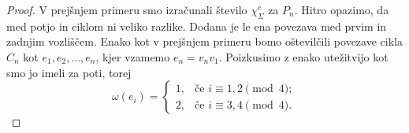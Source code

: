 \documentclass[12pt,a4paper,twoside]{article}
\theoremstyle{definition} %
\theoremstyle{plain} %
\newcommand{\ec}{\chi_{\Sigma}^e}
\numberwithin{equation}{section}  %
\begin{document}
\begin{proof}
	
	V prejšnjem primeru smo izračunali število $\ec$ za $P_n$. Hitro opazimo, da med potjo in ciklom ni veliko razlike. Dodana je le ena povezava med prvim in zadnjim vozliščem. Enako kot v prejšnjem primeru bomo oštevilčili povezave cikla $C_n$ kot $e_1, e_2, \ldots, e_n$, kjer vzamemo $e_n = v_n v_1$. Poizkusimo z enako utežitvijo kot smo jo imeli za poti, torej
		\begin{equation*}
	\omega(e_i) = \begin{cases}
			1, &\text{če } i \equiv 1,2 \pmod{4} ;\\ 
			2, &\text{če } i \equiv 3,4 \pmod{4} .
	\end{cases}
	\end{equation*}
	

\end{proof}
\end{document}
